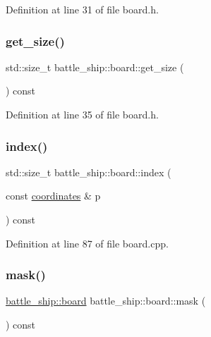 Definition at line 31 of file board.\+h.

\mbox{\label{classbattle__ship_1_1board_aea7bba93d5c16b0c550b5874e0ce04a7}} 
\subsubsection{\texorpdfstring{get\+\_\+size()}{get\_size()}}
{\footnotesize\ttfamily std\+::size\+\_\+t battle\+\_\+ship\+::board\+::get\+\_\+size (\begin{DoxyParamCaption}{ }\end{DoxyParamCaption}) const\hspace{0.3cm}{\ttfamily [inline]}}



Definition at line 35 of file board.\+h.

\mbox{\label{classbattle__ship_1_1board_a26993290a06429eff02afa64d7314dd5}} 
\subsubsection{\texorpdfstring{index()}{index()}}
{\footnotesize\ttfamily std\+::size\+\_\+t battle\+\_\+ship\+::board\+::index (\begin{DoxyParamCaption}\item[{const \hyperlink{structbattle__ship_1_1coordinates}{coordinates} \&}]{p }\end{DoxyParamCaption}) const}



Definition at line 87 of file board.\+cpp.

\mbox{\label{classbattle__ship_1_1board_a0dd14fd999e0359ad0a3ecee47fe639d}} 
\subsubsection{\texorpdfstring{mask()}{mask()}}
{\footnotesize\ttfamily \hyperlink{classbattle__ship_1_1board}{battle\+\_\+ship\+::board} battle\+\_\+ship\+::board\+::mask (\begin{DoxyParamCaption}{ }\end{DoxyParamCaption}) const}



